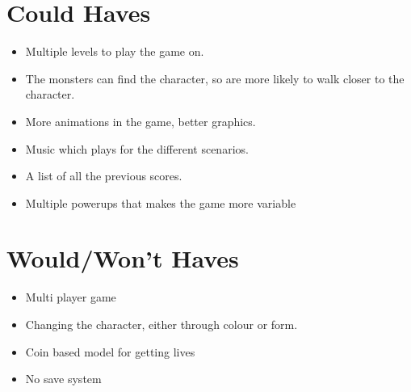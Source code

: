 \section{Could Haves}

\begin{itemize}
\itemsep0em 
  \item Multiple levels to play the game on.
  \item The monsters can find the character, so are more likely to walk closer to the character.
  \item More animations in the game, better graphics.
  \item Music which plays for the different scenarios.  
  \item A list of all the previous scores.
  \item Multiple powerups that makes the game more variable
\end{itemize}

\section{Would/Won't Haves}
\begin{itemize}
\itemsep0em 
	\item Multi player game
	\item Changing the character, either through colour or form.
	\item Coin based model for getting lives
	\item No save system
\end{itemize}